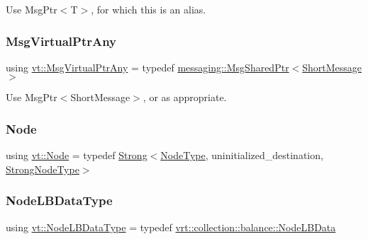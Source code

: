 Use {\ttfamily Msg\+Ptr$<$\+T$>$}, for which this is an alias. \mbox{\label{namespacevt_a54674b9f819f4f3a652c6f78d9b62aaf}} 
\subsubsection{\texorpdfstring{Msg\+Virtual\+Ptr\+Any}{MsgVirtualPtrAny}}
{\footnotesize\ttfamily using \hyperlink{namespacevt_a54674b9f819f4f3a652c6f78d9b62aaf}{vt\+::\+Msg\+Virtual\+Ptr\+Any} = typedef \hyperlink{structvt_1_1messaging_1_1_msg_shared_ptr}{messaging\+::\+Msg\+Shared\+Ptr}$<$\hyperlink{namespacevt_a1125ac1da6c0bbf141e0ea0739d7602d}{Short\+Message}$>$}

Use {\ttfamily Msg\+Ptr$<$\+Short\+Message$>$}, or as appropriate. \mbox{\label{namespacevt_a04777c732e1a2b2c317995af9972b999}} 
\subsubsection{\texorpdfstring{Node}{Node}}
{\footnotesize\ttfamily using \hyperlink{namespacevt_a04777c732e1a2b2c317995af9972b999}{vt\+::\+Node} = typedef \hyperlink{namespacevt_adbd3338278905742eb2de6db590fd2f1}{Strong}$<$\hyperlink{namespacevt_a866da9d0efc19c0a1ce79e9e492f47e2}{Node\+Type}, uninitialized\+\_\+destination, \hyperlink{structvt_1_1_strong_node_type}{Strong\+Node\+Type}$>$}

\mbox{\label{namespacevt_a19cb20485baa09ecc30086fbc62fd6ef}} 
\subsubsection{\texorpdfstring{Node\+L\+B\+Data\+Type}{NodeLBDataType}}
{\footnotesize\ttfamily using \hyperlink{namespacevt_a19cb20485baa09ecc30086fbc62fd6ef}{vt\+::\+Node\+L\+B\+Data\+Type} = typedef \hyperlink{structvt_1_1vrt_1_1collection_1_1balance_1_1_node_l_b_data}{vrt\+::collection\+::balance\+::\+Node\+L\+B\+Data}}

\mbox{\label{namespacevt_a866da9d0efc19c0a1ce79e9e492f47e2}} 
